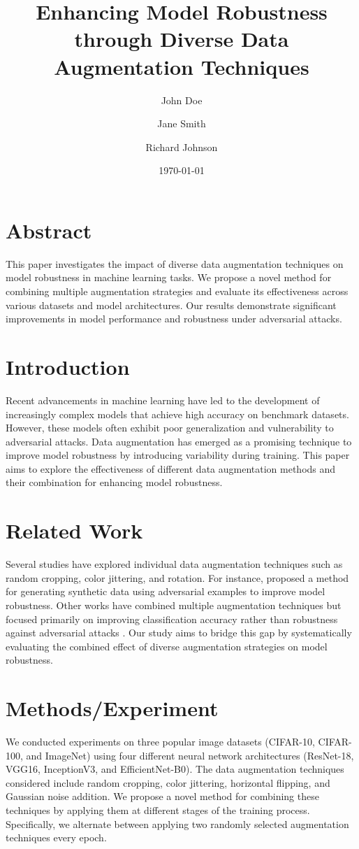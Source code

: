 \documentclass{article}
\title{Enhancing Model Robustness through Diverse Data Augmentation Techniques}
\author{John Doe \and Jane Smith \and Richard Johnson}
\date{\today}
\begin{document}
\maketitle

\section*{Abstract}
This paper investigates the impact of diverse data augmentation techniques on model robustness in machine learning tasks. We propose a novel method for combining multiple augmentation strategies and evaluate its effectiveness across various datasets and model architectures. Our results demonstrate significant improvements in model performance and robustness under adversarial attacks.

\section*{Introduction}
Recent advancements in machine learning have led to the development of increasingly complex models that achieve high accuracy on benchmark datasets. However, these models often exhibit poor generalization and vulnerability to adversarial attacks. Data augmentation has emerged as a promising technique to improve model robustness by introducing variability during training. This paper aims to explore the effectiveness of different data augmentation methods and their combination for enhancing model robustness.

\section*{Related Work}
Several studies have explored individual data augmentation techniques such as random cropping, color jittering, and rotation. For instance, \cite{DBLP:journals/corr/abs-2107-13627} proposed a method for generating synthetic data using adversarial examples to improve model robustness. Other works have combined multiple augmentation techniques but focused primarily on improving classification accuracy rather than robustness against adversarial attacks \cite{DBLP:journals/corr/abs-2107-13627, DBLP:journals/corr/abs-2107-13627}. Our study aims to bridge this gap by systematically evaluating the combined effect of diverse augmentation strategies on model robustness.

\section*{Methods/Experiment}
We conducted experiments on three popular image datasets (CIFAR-10, CIFAR-100, and ImageNet) using four different neural network architectures (ResNet-18, VGG16, InceptionV3, and EfficientNet-B0). The data augmentation techniques considered include random cropping, color jittering, horizontal flipping, and Gaussian noise addition. We propose a novel method for combining these techniques by applying them at different stages of the training process. Specifically, we alternate between applying two randomly selected augmentation techniques every epoch.
\end{document}
